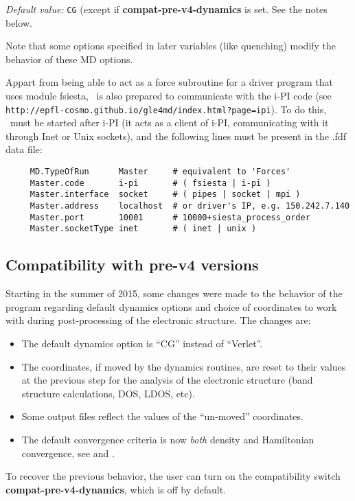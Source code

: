 \textit{Default value:} \texttt{CG} (except if \textbf{compat-pre-v4-dynamics}
is set. See the notes below.

Note that some options specified in later variables
(like quenching) modify the behavior of these MD options.

Appart from being able to act as a force subroutine for a driver program that
uses module fsiesta, \siesta\ is also prepared to communicate with the 
i-PI code (see \texttt{http://epfl-cosmo.github.io/gle4md/index.html?page=ipi}).
To do this, \siesta\ must be started after i-PI (it acts as a client of
i-PI, communicating with it through Inet or Unix sockets), and the following 
lines must be present in the .fdf data file:
\begin{verbatim}
     MD.TypeOfRun      Master     # equivalent to 'Forces'
     Master.code       i-pi       # ( fsiesta | i-pi )
     Master.interface  socket     # ( pipes | socket | mpi )
     Master.address    localhost  # or driver's IP, e.g. 150.242.7.140
     Master.port       10001      # 10000+siesta_process_order
     Master.socketType inet       # ( inet | unix )
\end{verbatim}

\subsection{Compatibility with pre-v4 versions}

Starting in the summer of 2015, some changes were made to the behavior
of the program regarding default dynamics options and choice of
coordinates to work with during post-processing of the electronic
structure. The changes are:

\begin{itemize}
\item The default dynamics option is ``CG'' instead of ``Verlet''.
\item The coordinates, if moved by the dynamics routines, are reset to
their values at the previous step for the analysis of the electronic 
structure (band structure calculations, DOS, LDOS, etc).
\item Some output files reflect the values of the ``un-moved''
  coordinates.
\item The default convergence criteria is now \emph{both} density
and Hamiltonian convergence, see  and .
\end{itemize}

To recover the previous behavior, the user can turn on the
compatibility switch \textbf{compat-pre-v4-dynamics}, which is off by
default.

